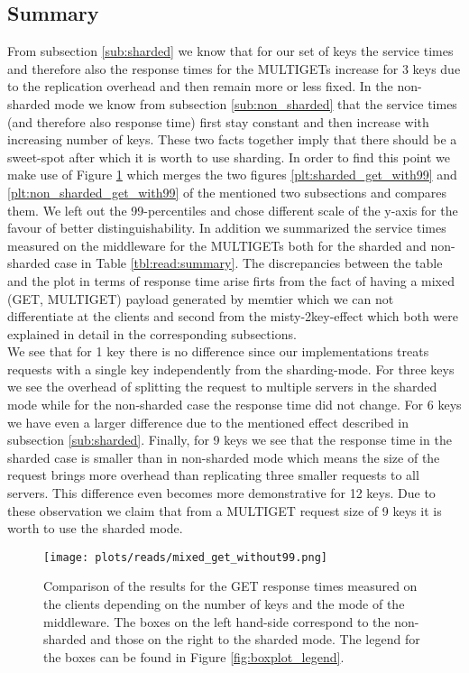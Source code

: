 \documentclass[11pt,a4paper]{article}
\begin{document}
\subsection{Summary}\label{sub:read:summary}
From subsection \ref{sub:sharded} we know that for our set of keys the service times and therefore also the response times for the MULTIGETs increase for 3 keys due to the replication overhead and then remain more or less fixed. In the non-sharded mode we know from subsection \ref{sub:non_sharded} that the service times (and therefore also response time) first stay constant and then increase with increasing number of keys. These two facts together imply that there should be a sweet-spot after which it is worth to use sharding. In order to find this point we make use of Figure \ref{plt:read:mix_get_without99} which merges the two figures \ref{plt:sharded_get_with99} and \ref{plt:non_sharded_get_with99} of the mentioned two subsections and compares them. We left out the 99-percentiles and chose different scale of the y-axis for the favour of better distinguishability. In addition we summarized the service times measured on the middleware for the MULTIGETs both for the sharded and non-sharded case in Table \ref{tbl:read:summary}. The discrepancies between the table and the plot in terms of response time arise firts from the fact of having a mixed (GET, MULTIGET) payload generated by memtier which we can not differentiate at the clients and second from the misty-2key-effect which both were explained in detail in the corresponding subsections. \\
We see that for 1 key there is no difference since our implementations treats requests with a single key independently from the sharding-mode. For three keys we see the overhead of splitting the request to multiple servers in the sharded mode while for the non-sharded case the response time did not change. For 6 keys we have even a larger difference due to the mentioned effect described in subsection \ref{sub:sharded}. Finally, for 9 keys we see that the response time in the sharded case is smaller than in non-sharded mode which means the size of the request brings more overhead than replicating three smaller requests to all servers. This difference even becomes more demonstrative for 12 keys. Due to these observation we claim that from a MULTIGET request size of 9 keys it is worth to use the sharded mode.

\begin{figure}[H]
\centering
    \texttt{[image: plots/reads/mixed\_get\_without99.png]}
\caption{Comparison of the results for the GET response times measured on the clients depending on the number of keys and the mode of the middleware. The boxes on the left hand-side correspond to the non-sharded and those on the right to the sharded mode. The legend for the boxes can be found in Figure \ref{fig:boxplot_legend}.}
\label{plt:read:mix_get_without99}
\end{figure}
\end{document}
